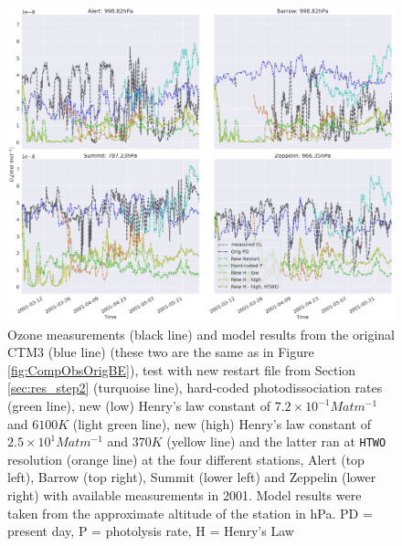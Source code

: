 \begin{figure}[ht]
    \centering
    \includegraphics[width=\linewidth]{Chapter6_Results/images/ozone_2001_step3.png}
    \caption{Ozone measurements (black line) and model results from the original CTM3 (blue line) (these two are the same as in Figure \ref{fig:CompObsOrigBE}), test with new restart file from Section \ref{sec:res_step2} (turquoise line), hard-coded photodissociation rates (green line), new (low) Henry's law constant of $7.2\times10^{-1} M atm ^{-1}$ and $6100 K$ (light green line), new (high) Henry's law constant of $2.5\times10^{1} M atm ^{-1}$ and $370 K$ (yellow line) and the latter ran at \texttt{HTWO} resolution (orange line) at the four different stations, Alert (top left), Barrow (top right), Summit (lower left) and Zeppelin (lower right) with available measurements in 2001. Model results were taken from the approximate altitude of the station in hPa. PD = present day, P = photolysis rate, H = Henry's Law}
    \label{fig:ozone_2001_step3}
\end{figure}